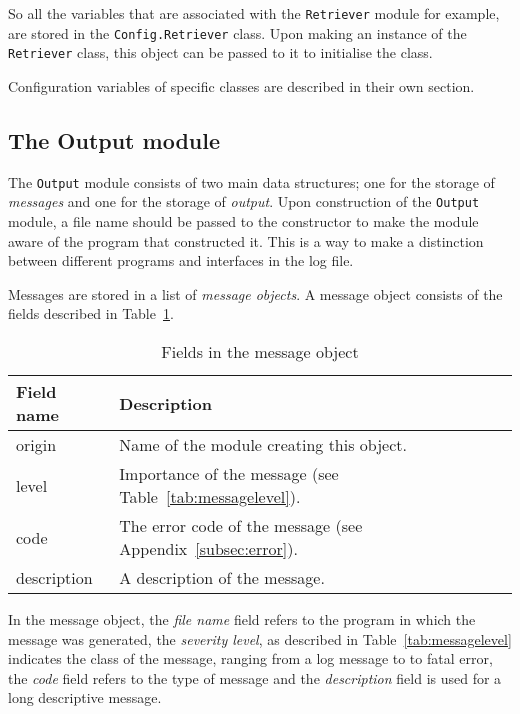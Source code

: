 \documentclass{article}
\begin{document}
So all the variables that are associated with the \texttt{Retriever} module for
example, are stored in the \texttt{Config.Retriever} class. Upon making an
instance of the \texttt{Retriever} class, this object can be passed to it to
initialise the class.

Configuration variables of specific classes are described in their own section.

\subsection{The Output module} \label{subsec:output}
The \texttt{Output} module consists of two main data structures; one for the
storage of \emph{messages} and one for the storage of \emph{output}. Upon
construction of the \texttt{Output} module, a file name should be passed to
the constructor to make the module aware of the program that constructed it.
This is a way to make a distinction between different programs and interfaces
in the log file.

Messages are stored in a list of \emph{message objects}. A message object
consists of the fields described in Table~\ref{tab:message}.

\begin{table}[H]
\begin{center}
\begin{tabular}{l|l}
Field name & Description \\
\hline
origin      & Name of the module creating this object. \\
level       & Importance of the message (see Table~\ref{tab:messagelevel}). \\
code        & The error code of the message
              (see Appendix~\ref{subsec:error}). \\
description & A description of the message.
\end{tabular}
\caption{Fields in the message object} \label{tab:message}
\end{center}
\end{table}

In the message object, the \emph{file name} field refers to the program in
which the message was generated, the \emph{severity level}, as described in
Table~\ref{tab:messagelevel} indicates the class of the message, ranging from a
log message to to fatal error, the \emph{code} field refers to the type of
message and the \emph{description} field is used for a long descriptive
message.
\end{document}
